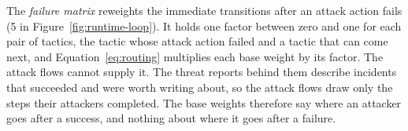 \documentclass{cshonours}
\begin{document}
The \emph{failure matrix} reweights the immediate transitions after an attack
action fails (5 in Figure~\ref{fig:runtime-loop}). It holds one factor
between zero and one for each pair of tactics, the tactic whose attack action
failed and a tactic that can come next, and Equation~\ref{eq:routing}
multiplies each base weight by its factor. The attack flows cannot supply
it. The threat reports behind them describe incidents that succeeded and were worth writing about,
so the attack flows draw only the steps their attackers completed. The base
weights therefore say where an attacker goes after a success, and nothing
about where it goes after a failure.
\end{document}
